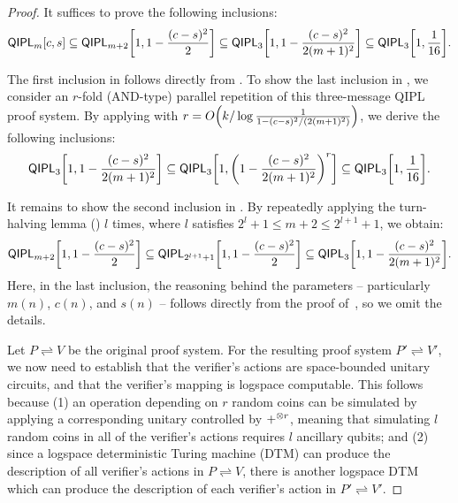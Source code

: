 \documentclass[10pt,a4paper]{article}
\numberwithin{equation}{section}
\numberwithin{figure}{section}
\newcommand{\QIPL}{\textnormal{\textsf{QIPL}}\xspace}
\newcommand{\protocol}[2]{{#1}\!\rightleftharpoons\!{#2}}
\DeclarePairedDelimiter\rbra{\lparen}{\rparen}
\DeclarePairedDelimiter\sbra{\lbrack}{\rbrack}
\let\ket\relax\DeclarePairedDelimiter\ket{\lvert}{\rangle}
\begin{document}
\begin{proof}
    It suffices to prove the following inclusions: 
    \begin{equation}
        \label{eq:QIPLconst-in-QIPL3}
        \QIPL_m[c,s] \subseteq \QIPL_{m+2}\sbra*{1,1-\frac{(c-s)^2}{2}} \subseteq \QIPL_{3}\sbra*{1,1-\frac{(c-s)^2}{2(m+1)^2}} \subseteq \QIPL_{3}\sbra*{1,\frac{1}{16}}.
    \end{equation}

    The first inclusion in  follows directly from . 
    To show the last inclusion in , we consider an $r$-fold (AND-type) parallel repetition of this three-message \QIPL{} proof system. 
    By applying  with $r = O\rbra*{k/\log\frac{1}{1-(c-s)^2/(2(m+1)^2)}}$, we derive the following inclusions:
    \[\QIPL_{3}\sbra*{1,1-\frac{(c-s)^2}{2(m+1)^2}} \subseteq \QIPL_{3}\sbra*{1,\rbra*{1-\frac{(c-s)^2}{2(m+1)^2}}^r} \subseteq \QIPL_{3}\sbra*{1,\frac{1}{16}}.\]

    It remains to show the second inclusion in . 
    By repeatedly applying the turn-halving lemma () $l$ times, where $l$ satisfies $2^l + 1 \leq m+2 \leq 2^{l+1}+1$, we obtain:
    \begin{equation}
        \label{eq:QIPLm-in-QIPL3}
        \QIPL_{m+2} \sbra*{1,1-\frac{(c-s)^2}{2}} \subseteq \QIPL_{2^{l+1}+1} \sbra*{1,1-\frac{(c-s)^2}{2}} \subseteq \QIPL_{3}\sbra*{1,1-\frac{(c-s)^2}{2(m+1)^2}}.
    \end{equation}
    Here, in the last inclusion, the reasoning behind the parameters -- particularly $m(n)$, $c(n)$, and $s(n)$ -- follows directly from the proof of~\cite[Lemma 4.2]{KKMV09}, so we omit the details. 

    Let $\protocol{P}{V}$ be the original proof system. For the resulting proof system $\protocol{P'}{V'}$, we now need to establish that the verifier's actions are space-bounded unitary circuits, and that the verifier's mapping is logspace computable. 
    This follows because (1) an operation depending on $r$ random coins can be simulated by applying a corresponding unitary controlled by $\ket{+}^{\otimes r}$, meaning that simulating $l$ random coins in all of the verifier's actions requires $l$ ancillary qubits; and (2) since a logspace deterministic Turing machine (DTM) can produce the description of all verifier's actions in $\protocol{P}{V}$, there is another logspace DTM which can produce the description of each verifier's action in $\protocol{P'}{V'}$. 
\end{proof}
\end{document}
